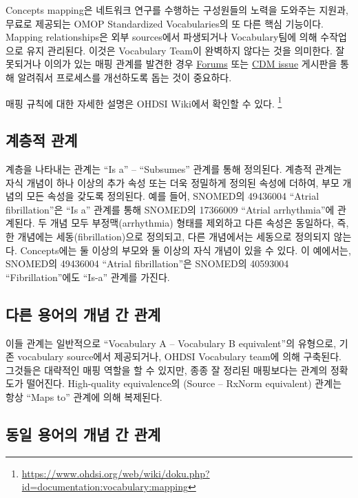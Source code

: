 \documentclass[11pt]{book}
\let\rmarkdownfootnote\footnote%
\def\footnote{\protect\rmarkdownfootnote}
\theoremstyle{definition}
\theoremstyle{definition}
\theoremstyle{definition}
\theoremstyle{remark}
\begin{document}
Concepts mapping은 네트워크 연구를 수행하는 구성원들의 노력을 도와주는
지원과, 무료로 제공되는 OMOP Standardized Vocabularies의 또 다른 핵심
기능이다. Mapping relationships은 외부 sources에서 파생되거나
Vocabulary팀에 의해 수작업으로 유지 관리된다. 이것은 Vocabulary Team이
완벽하지 않다는 것을 의미한다. 잘못되거나 이의가 있는 매핑 관계를 발견한
경우 \href{https://forums.ohdsi.org}{Forums} 또는
\href{https://github.com/OHDSI/CommonDataModel/issues}{CDM issue}
게시판을 통해 알려줘서 프로세스를 개선하도록 돕는 것이 중요하다.

매핑 규칙에 대한 자세한 설명은 OHDSI Wiki에서 확인할 수 있다. \footnote{\url{https://www.ohdsi.org/web/wiki/doku.php?id=documentation:vocabulary:mapping}}

\subsection{계층적 관계}\label{-}

계층을 나타내는 관계는 ``Is a'' -- ``Subsumes'' 관계를 통해 정의된다.
계층적 관계는 자식 개념이 하나 이상의 추가 속성 또는 더욱 정밀하게
정의된 속성에 더하여, 부모 개념의 모든 속성을 갖도록 정의된다. 예를
들어, SNOMED의 49436004 ``Atrial fibrillation''은 ``Is a'' 관계를 통해
SNOMED의 17366009 ``Atrial arrhythmia''에 관계된다. 두 개념 모두
부정맥(arrhythmia) 형태를 제외하고 다른 속성은 동일하다, 즉, 한 개념에는
세동(fibrillation)으로 정의되고, 다른 개념에서는 세동으로 정의되지
않는다. Concepts에는 둘 이상의 부모와 둘 이상의 자식 개념이 있을 수
있다. 이 예에서는, SNOMED의 49436004 ``Atrial fibrillation''은 SNOMED의
40593004 ``Fibrillation''에도 ``Is-a'' 관계를 가진다.

\subsection{다른 용어의 개념 간 관계}\label{----}

이들 관계는 일반적으로 ``Vocabulary A -- Vocabulary B equivalent''의
유형으로, 기존 vocabulary source에서 제공되거나, OHDSI Vocabulary team에
의해 구축된다. 그것들은 대략적인 매핑 역할을 할 수 있지만, 종종 잘
정리된 매핑보다는 관계의 정확도가 떨어진다. High-quality equivalence의
(Source -- RxNorm equivalent) 관계는 항상 ``Maps to'' 관계에 의해
복제된다.

\subsection{동일 용어의 개념 간 관계}\label{----}
\end{document}

